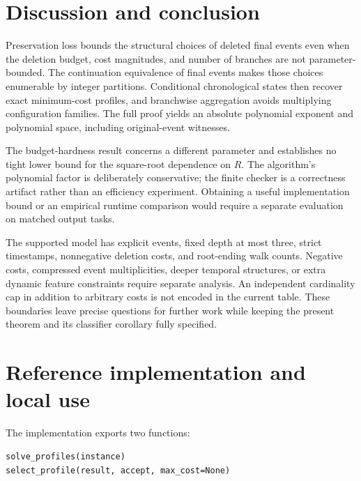 \documentclass[11pt]{article}
\theoremstyle{remark}
\begin{document}
\section{Discussion and conclusion}\label{sec:conclusion}

Preservation loss bounds the structural choices of deleted final events even
when the deletion budget, cost magnitudes, and number of branches are not
parameter-bounded. The continuation equivalence of final events makes those
choices enumerable by integer partitions. Conditional chronological states
then recover exact minimum-cost profiles, and branchwise aggregation avoids
multiplying configuration families. The full proof yields an absolute
polynomial exponent and polynomial space, including original-event witnesses.

The budget-hardness result concerns a different parameter and establishes no
tight lower bound for the square-root dependence on $R$. The algorithm's
polynomial factor is deliberately conservative; the finite checker is a
correctness artifact rather than an efficiency experiment. Obtaining a useful
implementation bound or an empirical runtime comparison would require a
separate evaluation on matched output tasks.

The supported model has explicit events, fixed depth at most three, strict
timestamps, nonnegative deletion costs, and root-ending walk counts. Negative
costs, compressed event multiplicities, deeper temporal structures, or extra
dynamic feature constraints require separate analysis. An independent
cardinality cap in addition to arbitrary costs is not encoded in the current
table. These boundaries leave precise questions for further work while keeping
the present theorem and its classifier corollary fully specified.

\appendix



\section{Reference implementation and local use}

\begin{minipage}{\linewidth}
The implementation exports two functions:
\begin{lstlisting}
solve_profiles(instance)
select_profile(result, accept, max_cost=None)
\end{lstlisting}
\end{minipage}
\end{document}
